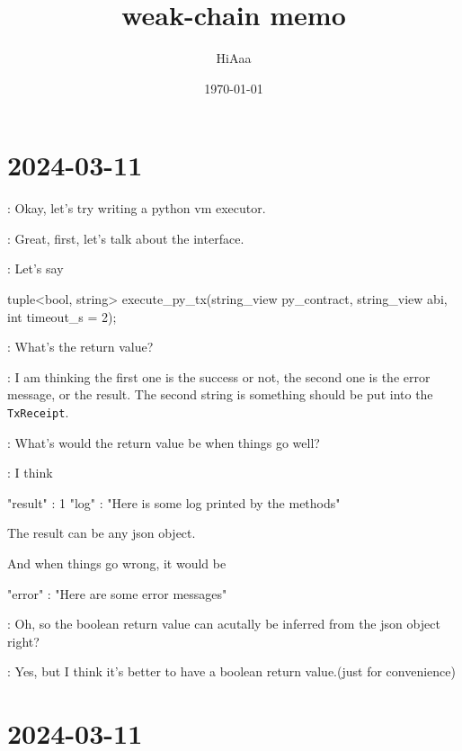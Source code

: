 \documentclass[dvipsnames]{article}
\title{weak-chain memo}
\date{\today}
\author{HiAaa}
\begin{document}
\maketitle
\tableofcontents{}
\newpage{}

% 
% 
% 


\section*{2024-03-11}

 :  Okay, let's try writing a python vm executor.

 : Great, first, let's talk about the interface.

 : Let's say

\begin{simplec}
tuple<bool, string> execute_py_tx(string_view py_contract, string_view abi, int timeout_s = 2);
\end{simplec}

 : What's the return value?

 : I am thinking the first one is the success or not, the second
one is the error message, or the result. The second string is something should
be put into the \texttt{TxReceipt}.

 : What's would the return value be when things go well?

 : I think

\begin{simplejs}
{
    "result" : 1
    "log" : "Here is some log printed by the methods"
}
\end{simplejs}

The result can be any json object.

And when things go wrong, it would be
\begin{simplejs}
{
    "error" : "Here are some error messages"
}
\end{simplejs}

 : Oh, so the boolean return value can acutally be inferred from
the json object right?

 : Yes, but I think it's better to have a boolean return
value.(just for convenience)

\section*{2024-03-11}
\end{document}
